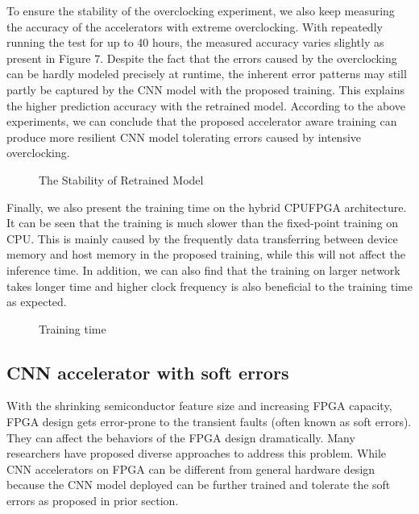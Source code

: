 To ensure the stability of the overclocking experiment, we 
also keep measuring the accuracy of the accelerators with extreme 
overclocking. With repeatedly running the test for up to 40 hours, 
the measured accuracy varies slightly as present in Figure 7. 
Despite the fact that the errors caused by the overclocking can be 
hardly modeled precisely at runtime, the inherent error patterns may 
still partly be captured by the CNN model with the proposed training. 
This explains the higher prediction accuracy with the retrained model. 
According to the above experiments, we can conclude that the proposed 
accelerator aware training can produce more resilient CNN model tolerating 
errors caused by intensive overclocking. 

\begin{figure}
        \caption{The Stability of Retrained Model}
        \label{fig:stability}
\end{figure}

  Finally, we also present the training time on the hybrid CPUFPGA architecture. 
It can be seen that the training is much slower than the fixed-point training on CPU. 
This is mainly caused by the frequently data transferring between device memory and host 
memory in the proposed training, while this will not affect the inference time. In addition, 
we can also find that the training on larger network takes longer time and higher clock frequency 
is also beneficial to the training time as expected. 

\begin{figure}
        \caption{Training time}
        \label{fig:time}
\end{figure}

\subsection{CNN accelerator with soft errors}
  With the shrinking semiconductor feature size and increasing FPGA capacity, 
FPGA design gets error-prone to the transient faults (often known as soft errors). 
They can affect the behaviors of the FPGA design dramatically. Many researchers \cite{Mansour_20,Karim_21,Nidhin_22,Subasi_23,ROSCH_24} 
have proposed diverse approaches to address this problem. While CNN accelerators on FPGA can be different 
from general hardware design because the CNN model deployed can be further trained and tolerate the 
soft errors as proposed in prior section\cite{Tu2018RANA_1}.

